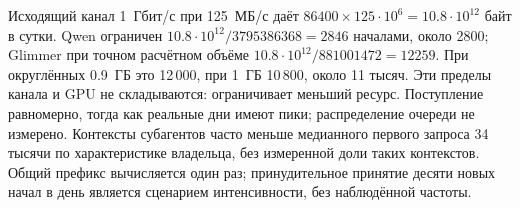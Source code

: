 Исходящий канал 1~Гбит/с при 125~МБ/с даёт
$86400\times125\cdot10^6=10.8\cdot10^{12}$ байт в сутки.
Qwen ограничен $10.8\cdot10^{12}/3795386368=2846$ началами, около 2800;
Glimmer при точном расчётном объёме $10.8\cdot10^{12}/881001472=12259$.
При округлённых 0.9~ГБ это 12\,000, при 1~ГБ 10\,800, около 11 тысяч.
Эти пределы канала и GPU не складываются: ограничивает меньший ресурс.
Поступление равномерно, тогда как реальные дни имеют пики; распределение очереди не измерено.
Контексты субагентов часто меньше медианного первого запроса 34 тысячи по характеристике владельца,
без измеренной доли таких контекстов. Общий префикс вычисляется один раз;
принудительное принятие десяти новых начал в день является сценарием интенсивности, без наблюдённой частоты.

